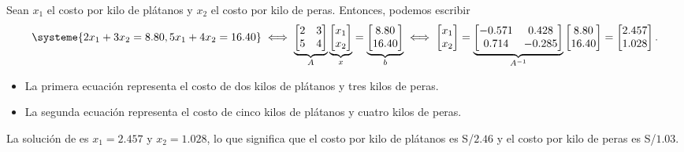 \begin{frame}
\begin{solution}
\begin{enumerate}[a)]
			      Sean $x_{1}$ el \alert{costo por kilo de plátanos} y
			      $x_{2}$ el \alert{costo por kilo de peras}.
			      Entonces, podemos escribir
			      \begin{equation*}
				      \systeme{
				      2x_{1}+3x_{2}=8.80,
				      5x_{1}+4x_{2}=16.40
				      }\iff
				      \underbrace{
					      \begin{bmatrix}
						      2 & 3 \\
						      5 & 4
					      \end{bmatrix}
				      }_{A}
				      \underbrace{
					      \begin{bmatrix}
						      x_{1} \\
						      x_{2}
					      \end{bmatrix}
				      }_{x}=
				      \underbrace{
					      \begin{bmatrix}
						      8.80 \\
						      16.40
					      \end{bmatrix}
				      }_{b}\iff
				      \begin{bmatrix}
					      x_{1} \\
					      x_{2}
				      \end{bmatrix}=
				      \underbrace{
					      \begin{bmatrix}
						      -0.571 & 0.428  \\
						      0.714  & -0.285
					      \end{bmatrix}
				      }_{A^{-1}}
				      \begin{bmatrix}
					      8.80 \\
					      16.40
				      \end{bmatrix}=
				      \begin{bmatrix}
					      2.457 \\
					      1.028
				      \end{bmatrix}.
			      \end{equation*}

			      \begin{itemize}
				      \item

				            La primera ecuación representa el costo de dos
				            kilos de plátanos y tres kilos de peras.

				      \item
				            La segunda ecuación representa el costo de cinco
				            kilos de plátanos y cuatro kilos de peras.

			      \end{itemize}

			      La solución de es $x_{1}=2.457$ y $x_{2}=1.028$, lo que
			      significa que el costo por kilo de plátanos es S/$2.46$ y
			      el costo por kilo de peras es S/$1.03$.
		\end{enumerate}
	\end{solution}
\end{frame}

